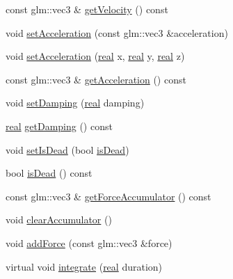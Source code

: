 \begin{DoxyCompactItemize}
\item 
const glm\+::vec3 \& \mbox{\hyperlink{classrum_1_1_particle_a49fafb2e446e26e2e2bedb772d6643fd}{get\+Velocity}} () const
\item 
void \mbox{\hyperlink{classrum_1_1_particle_a1e816cd9d1bf1bd670645c04800e12bb}{set\+Acceleration}} (const glm\+::vec3 \&acceleration)
\item 
void \mbox{\hyperlink{classrum_1_1_particle_a98cb259d81413be0128e173de809b7f1}{set\+Acceleration}} (\mbox{\hyperlink{namespacerum_a7e8cca23573d5eaead0f138cbaa4862c}{real}} x, \mbox{\hyperlink{namespacerum_a7e8cca23573d5eaead0f138cbaa4862c}{real}} y, \mbox{\hyperlink{namespacerum_a7e8cca23573d5eaead0f138cbaa4862c}{real}} z)
\item 
const glm\+::vec3 \& \mbox{\hyperlink{classrum_1_1_particle_a0f10955af0147e9c4c65f606bfe33d2c}{get\+Acceleration}} () const
\item 
void \mbox{\hyperlink{classrum_1_1_particle_a79a5ff24e44cf8acee7d4a1928112d2b}{set\+Damping}} (\mbox{\hyperlink{namespacerum_a7e8cca23573d5eaead0f138cbaa4862c}{real}} damping)
\item 
\mbox{\hyperlink{namespacerum_a7e8cca23573d5eaead0f138cbaa4862c}{real}} \mbox{\hyperlink{classrum_1_1_particle_acf395f41a9fa123f996e5315ce641aa3}{get\+Damping}} () const
\item 
void \mbox{\hyperlink{classrum_1_1_particle_a762d4b38f5557d3ce3f2020aab8cbd07}{set\+Is\+Dead}} (bool \mbox{\hyperlink{classrum_1_1_particle_a95595b39aad9ae5a2146e05b836d4957}{is\+Dead}})
\item 
bool \mbox{\hyperlink{classrum_1_1_particle_a95595b39aad9ae5a2146e05b836d4957}{is\+Dead}} () const
\item 
const glm\+::vec3 \& \mbox{\hyperlink{classrum_1_1_particle_a9eefff658cc950952153aefc58d6bea6}{get\+Force\+Accumulator}} () const
\item 
void \mbox{\hyperlink{classrum_1_1_particle_a6d3aa962929ee699bf324330dc3ebf69}{clear\+Accumulator}} ()
\item 
void \mbox{\hyperlink{classrum_1_1_particle_a70292de889740fba9fd0624f4a88bf91}{add\+Force}} (const glm\+::vec3 \&force)
\item 
virtual void \mbox{\hyperlink{classrum_1_1_particle_a6eb27b64ae963d386cf563bafade51c5}{integrate}} (\mbox{\hyperlink{namespacerum_a7e8cca23573d5eaead0f138cbaa4862c}{real}} duration)
\end{DoxyCompactItemize}
